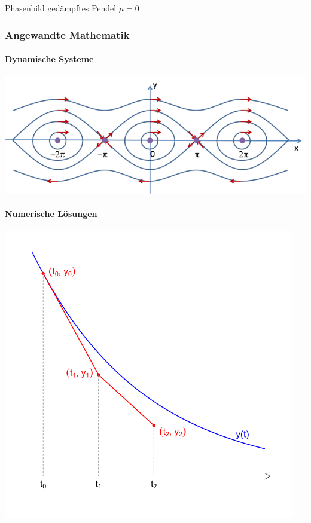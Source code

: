\documentclass{beamer}
\begin{document}
 \begin{frame}
    \begin{block}{Phasenbild gedämpftes Pendel}
    $\mu = 0$
    \frametitle{Angewandte Mathematik}
\framesubtitle{Dynamische Systeme }
\includegraphics[scale=0.9]{images/pendulum1}
    \end{block}
\end{frame}







 \begin{frame}
\framesubtitle{Numerische Lösungen}
\includegraphics[scale=0.6]{images/euler}

\end{frame}
\end{document}
